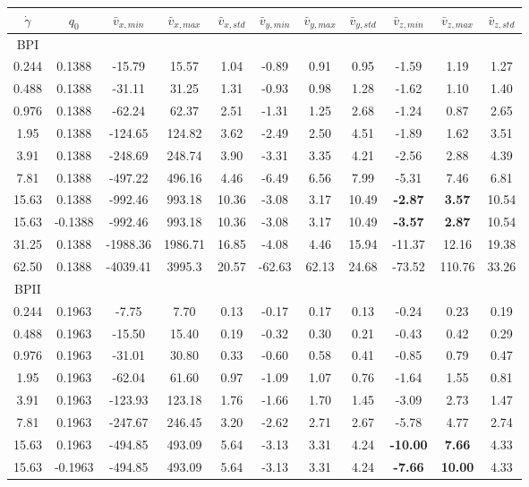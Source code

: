 \documentclass[aps,pre,reprint,superscriptaddress]{revtex4}
\begin{document}
\begin{table}
\begin{tabular}{|c|| c || c |c |c||c| c| c||c| c| c|}
\hline
$\dot{\gamma}$ & $q_0$ & $\bar{v}_{x,min}$ & $\bar{v}_{x,max}$ & $\bar{v}_{x,std}$ & $\bar{v}_{y,min}$ & $\bar{v}_{y,max}$ & $\bar{v}_{y,std}$ & $\bar{v}_{z,min}$ & $\bar{v}_{z,max}$ & $\bar{v}_{z,std}$ \\
\hline
BPI \\
\hline
0.244 & 0.1388 &-15.79 &15.57 &1.04 &-0.89 &0.91 &0.95 &-1.59 &1.19 &1.27 \\
0.488 &0.1388 &-31.11 &31.25 &1.31 &-0.93 &0.98 &1.28 &-1.62 &1.10 &1.40 \\
0.976 &0.1388 &-62.24 &62.37 &2.51 &-1.31 &1.25 &2.68 &-1.24 &0.87 &2.65 \\
1.95 & 0.1388 &-124.65 &124.82 &3.62&  -2.49 &2.50 &4.51 &-1.89 & 1.62 &3.51 \\
3.91 &0.1388 &-248.69 &248.74 &3.90&  -3.31 &3.35 &4.21 &-2.56 & 2.88 &4.39 \\
7.81 &0.1388 &-497.22 &496.16 &4.46 &-6.49 &6.56 &7.99 &-5.31 & 7.46 &6.81 \\ 
15.63 &0.1388 &-992.46 &993.18 &10.36 &-3.08 &3.17 &10.49 &\bf{-2.87} & \bf{3.57} &10.54 \\
15.63 &-0.1388 &-992.46 &993.18 &10.36 &-3.08 &3.17 &10.49 &\bf{-3.57} & \bf{2.87} &10.54 \\
31.25 &0.1388 & -1988.36 &1986.71 &16.85 &-4.08 &4.46 &15.94 &-11.37 & 12.16 &19.38\\
62.50 &0.1388 & -4039.41 &3995.3  & 20.57 & -62.63 & 62.13 & 24.68 &-73.52 & 110.76 & 33.26 \\
\hline
BPII \\
\hline
0.244 &0.1963 &-7.75 &7.70 &0.13 &-0.17 &0.17 &0.13 &-0.24 &0.23 &0.19 \\
0.488 &0.1963 &-15.50 &15.40 &0.19 &-0.32 &0.30 &0.21 &-0.43 &0.42 &0.29 \\
0.976 &0.1963 &-31.01 &30.80 &0.33 &-0.60 &0.58 &0.41 &-0.85 &0.79 &0.47 \\
1.95 & 0.1963 &-62.04  &61.60 & 0.97 & -1.09 &1.07 & 0.76 & -1.64 & 1.55 & 0.81\\
3.91 & 0.1963 &-123.93 &123.18 & 1.76 &-1.66 &1.70 & 1.45 &-3.09& 2.73 &1.47\\
7.81 &0.1963  &-247.67 &246.45 & 3.20 &-2.62 &2.71 & 2.67 &-5.78 & 4.77 &2.74\\
15.63 &0.1963 &-494.85 &493.09 & 5.64 &-3.13 &3.31 &4.24 &\bf{-10.00} & \bf{7.66} &4.33\\
15.63 &-0.1963&-494.85 &493.09 & 5.64 & -3.13 &3.31 &4.24 &\bf{-7.66} & \bf{10.00} &4.33\\

\end{tabular}
\end{table}
\end{document}
